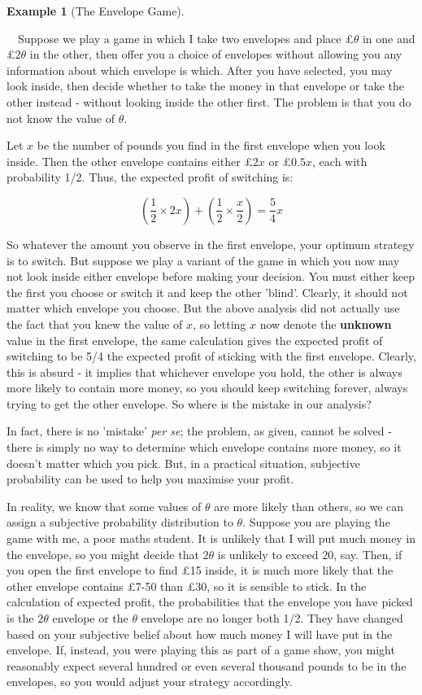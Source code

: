 \documentclass[12pt,a4paper]{article}
\newtheorem{ex}[thm]{Example}
\begin{document}
\begin{ex}[The Envelope Game]\label{envelope}
\end{ex}
$\quad$Suppose we play a game in which I take two envelopes and place \pounds$\theta$ in one and \pounds$2\theta$ in the other, then offer you a choice of envelopes without allowing you any information about which envelope is which. After you have selected, you may look inside, then decide whether to take the money in that envelope or take the other instead - without looking inside the other first. The problem is that you do not know the value of $\theta$.

Let $x$ be the number of pounds you find in the first envelope when you look inside. Then the other envelope contains either \pounds$2x$ or \pounds$0.5x$, each with probability 1/2. Thus, the expected profit of switching is:

$$\left(\frac{1}{2}\times 2x\right) + \left(\frac{1}{2} \times \frac{x}{2}\right) = \frac{5}{4}x$$

\indent So whatever the amount you observe in the first envelope, your optimum strategy is to switch. But suppose we play a variant of the game in which you now may not look inside either envelope before making your decision. You must either keep the first you choose or switch it and keep the other 'blind'. Clearly, it should not matter which envelope you choose. But the above analysis did not actually use the fact that you knew the value of $x$, so letting $x$ now denote the \textbf{unknown} value in the first envelope, the same calculation gives the expected profit of switching to be 5/4 the expected profit of sticking with the first envelope. Clearly, this is absurd - it implies that whichever envelope you hold, the other is always more likely to contain more money, so you should keep switching forever, always trying to get the other envelope. So where is the mistake in our analysis?

In fact, there is no 'mistake' {\it per se}; the problem, as given, cannot be solved - there is simply no way to determine which envelope contains more money, so it doesn't matter which you pick. But, in a practical situation, subjective probability can be used to help you maximise your profit.

In reality, we know that some values of $\theta$ are more likely than others, so we can assign a subjective probability distribution to $\theta$. Suppose you are playing the game with me, a poor maths student. It is unlikely that I will put much money in the envelope, so you might decide that $2 \theta$ is unlikely to exceed 20, say. Then, if you open the first envelope to find \pounds 15 inside, it is much more likely that the other envelope contains \pounds 7-50 than \pounds 30, so it is sensible to stick. In the calculation of expected profit, the probabilities that the envelope you have picked is the $2\theta$ envelope or the $\theta$ envelope are no longer both 1/2. They have changed based on your subjective belief about how much money I will have put in the envelope. If, instead, you were playing this as part of a game show, you might reasonably expect several hundred or even several thousand pounds to be in the envelopes, so you would adjust your strategy accordingly.
\end{document}
